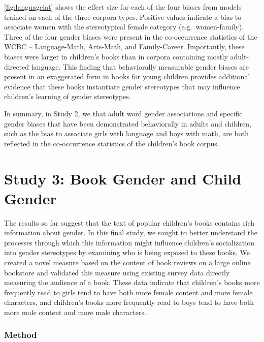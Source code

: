 \documentclass[
  english,
  ,man,floatsintext]{apa6}
\begin{document}
\autoref{fig:languageiat} shows the effect size for each of the four biases from models trained on each of the three corpora types. Positive values indicate a bias to associate women with the stereotypical female category (e.g.~women-family). Three of the four gender biases were present in the co-occurrence statistics of the WCBC -- Language-Math, Arts-Math, and Family-Career. Importantly, these biases were larger in children's books than in corpora containing mostly adult-directed language. This finding that behaviorally measurable gender biases are present in an exaggerated form in books for young children provides additional evidence that these books instantiate gender stereotypes that may influence children's learning of gender stereotypes.

In summary, in Study 2, we that adult word gender associations and specific gender biases that have been demonstrated behaviorally in adults and children, such as the bias to associate girls with language and boys with math, are both reflected in the co-occurrence statistics of the children's book corpus.

\hypertarget{study-3-book-gender-and-child-gender}{%
\section{Study 3: Book Gender and Child Gender}\label{study-3-book-gender-and-child-gender}}

The results so far suggest that the text of popular children's books contains rich information about gender. In this final study, we sought to better understand the processes through which this information might influence children's socialization into gender stereotypes by examining who is being exposed to these books. We created a novel measure based on the content of book reviews on a large online bookstore and validated this measure using existing survey data directly measuring the audience of a book. These data indicate that children's books more frequently read to girls tend to have both more female content and more female characters, and children's books more frequently read to boys tend to have both more male content and more male characters.

\hypertarget{method-3}{%
\subsubsection{Method}\label{method-3}}
\end{document}
